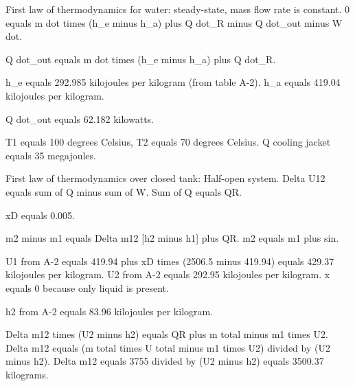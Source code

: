 First law of thermodynamics for water: steady-state, mass flow rate is constant.  
0 equals m dot times (h_e minus h_a) plus Q dot_R minus Q dot_out minus W dot.  

Q dot_out equals m dot times (h_e minus h_a) plus Q dot_R.  

h_e equals 292.985 kilojoules per kilogram (from table A-2).  
h_a equals 419.04 kilojoules per kilogram.  

Q dot_out equals 62.182 kilowatts.

T1 equals 100 degrees Celsius, T2 equals 70 degrees Celsius.  
Q cooling jacket equals 35 megajoules.  

First law of thermodynamics over closed tank: Half-open system.  
Delta U12 equals sum of Q minus sum of W.  
Sum of Q equals QR.  

xD equals 0.005.  

m2 minus m1 equals Delta m12 [h2 minus h1] plus QR.  
m2 equals m1 plus sin.  

U1 from A-2 equals 419.94 plus xD times (2506.5 minus 419.94) equals 429.37 kilojoules per kilogram.  
U2 from A-2 equals 292.95 kilojoules per kilogram.  
x equals 0 because only liquid is present.  

h2 from A-2 equals 83.96 kilojoules per kilogram.  

Delta m12 times (U2 minus h2) equals QR plus m total minus m1 times U2.  
Delta m12 equals (m total times U total minus m1 times U2) divided by (U2 minus h2).  
Delta m12 equals 3755 divided by (U2 minus h2) equals 3500.37 kilograms.